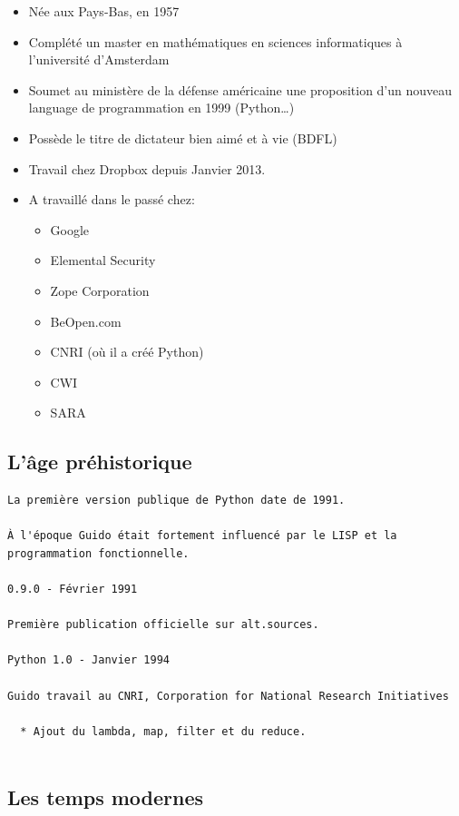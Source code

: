 \documentclass[letterpaper,10pt,english]{/Users/mlhamel/venv/apius/lib/python2.7/site-packages/sphinx/texinputs/sphinxhowto}
\begin{document}
\begin{itemize}
\item
  Née aux Pays-Bas, en 1957
\item
  Complété un master en mathématiques en sciences informatiques à
  l'université d'Amsterdam
\item
  Soumet au ministère de la défense américaine une proposition d'un
  nouveau language de programmation en 1999 (Python\ldots{})
\item
  Possède le titre de dictateur bien aimé et à vie (BDFL)
\item
  Travail chez Dropbox depuis Janvier 2013.
\item
  A travaillé dans le passé chez:

  \begin{itemize}
  \itemsep1pt\parskip0pt
  \item
    Google
  \item
    Elemental Security
  \item
    Zope Corporation
  \item
    BeOpen.com
  \item
    CNRI (où il a créé Python)
  \item
    CWI
  \item
    SARA
  \end{itemize}
\end{itemize}\subsection{L'âge préhistorique}\label{lâge-préhistorique}

\begin{verbatim}
La première version publique de Python date de 1991.

À l'époque Guido était fortement influencé par le LISP et la programmation fonctionnelle.

0.9.0 - Février 1991 

Première publication officielle sur alt.sources.

Python 1.0 - Janvier 1994

Guido travail au CNRI, Corporation for National Research Initiatives 
    
  * Ajout du lambda, map, filter et du reduce.
  
\end{verbatim}\subsection{Les temps modernes}\label{les-temps-modernes}
\end{document}
